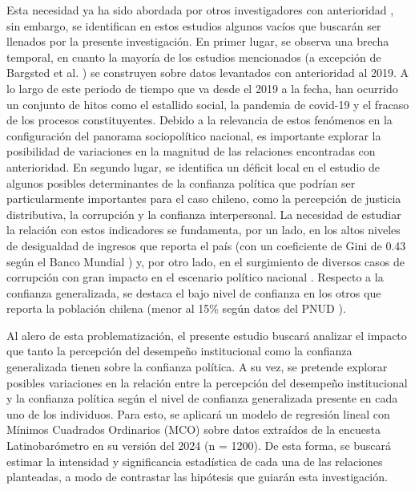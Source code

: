 \documentclass[12pt,twoside]{templates/facsothesis}
\begin{document}
Esta necesidad ya ha sido abordada por otros investigadores con anterioridad \citep[véase][]{bargstedSocialPoliticalTrust2023, moralesquirogaEvaluandoConfianzaInstitucional2008, riffoQueInfluyeConfianza2019, saldanazunigaConfianzaInstitucionesPoliticas2019, segoviaMalaiseDemocracyChile2016, segoviaConfianzaInstitucionesPoliticas2008}, sin embargo, se identifican en estos estudios algunos vacíos que buscarán ser llenados por la presente investigación. En primer lugar, se observa una brecha temporal, en cuanto la mayoría de los estudios mencionados (a excepción de Bargsted et al. \citeyearpar{bargstedSocialPoliticalTrust2023}) se construyen sobre datos levantados con anterioridad al 2019. A lo largo de este periodo de tiempo que va desde el 2019 a la fecha, han ocurrido un conjunto de hitos como el estallido social, la pandemia de covid-19 y el fracaso de los procesos constituyentes. Debido a la relevancia de estos fenómenos en la configuración del panorama sociopolítico nacional, es importante explorar la posibilidad de variaciones en la magnitud de las relaciones encontradas con anterioridad. En segundo lugar, se identifica un déficit local en el estudio de algunos posibles determinantes de la confianza política que podrían ser particularmente importantes para el caso chileno, como la percepción de justicia distributiva, la corrupción y la confianza interpersonal. La necesidad de estudiar la relación con estos indicadores se fundamenta, por un lado, en los altos niveles de desigualdad de ingresos que reporta el país (con un coeficiente de Gini de 0.43 según el Banco Mundial \citeyearpar{bancomundialIndicadoresDesarrolloMundial2023}) y, por otro lado, en el surgimiento de diversos casos de corrupción con gran impacto en el escenario político nacional \citep{avendanoPropuestasCambioDebilidad2021}. Respecto a la confianza generalizada, se destaca el bajo nivel de confianza en los otros que reporta la población chilena (menor al 15\% según datos del PNUD \citeyearpar{pnudInformeSobreDesarrollo2024}).

Al alero de esta problematización, el presente estudio buscará analizar el impacto que tanto la percepción del desempeño institucional como la confianza generalizada tienen sobre la confianza política. A su vez, se pretende explorar posibles variaciones en la relación entre la percepción del desempeño institucional y la confianza política según el nivel de confianza generalizada presente en cada uno de los individuos. Para esto, se aplicará un modelo de regresión lineal con Mínimos Cuadrados Ordinarios (MCO) sobre datos extraídos de la encuesta Latinobarómetro en su versión del 2024 (n = 1200). De esta forma, se buscará estimar la intensidad y significancia estadística de cada una de las relaciones planteadas, a modo de contrastar las hipótesis que guiarán esta investigación.
\end{document}
